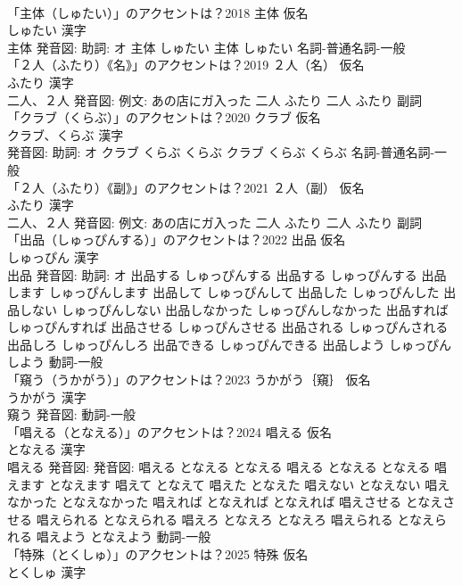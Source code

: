 \documentclass[8pt]{extreport}
\begin{document}
\begin{CJK}{UTF8}{min}
\\	「主体（しゅたい）」のアクセントは？2018	主体 仮名　
\\	しゅたい 漢字　
\\	主体 発音図: 助詞: オ	主体 しゅたい		主体 しゅたい				名詞-普通名詞-一般 
\\	「２人（ふたり）《名》」のアクセントは？2019	２人（名） 仮名　
\\	ふたり 漢字　
\\	二人、２人 発音図: 例文: あの店にガ入った	二人 ふたり		二人 ふたり				副詞 
\\	「クラブ（くらぶ）」のアクセントは？2020	クラブ 仮名　
\\	クラブ、くらぶ 漢字　
\\	発音図: 助詞: オ	クラブ くらぶ くらぶ		クラブ くらぶ くらぶ				名詞-普通名詞-一般 
\\	「２人（ふたり）《副》」のアクセントは？2021	２人（副） 仮名　
\\	ふたり 漢字　
\\	二人、２人 発音図: 例文: あの店にガ入った	二人 ふたり		二人 ふたり				副詞 
\\	「出品（しゅっぴんする）」のアクセントは？2022	出品 仮名　
\\	しゅっぴん 漢字　
\\	出品 発音図: 助詞: オ	出品する しゅっぴんする		出品する しゅっぴんする 出品します しゅっぴんします 出品して しゅっぴんして 出品した しゅっぴんした 出品しない しゅっぴんしない 出品しなかった しゅっぴんしなかった 出品すれば しゅっぴんすれば 出品させる しゅっぴんさせる 出品される しゅっぴんされる 出品しろ しゅっぴんしろ 出品できる しゅっぴんできる 出品しよう しゅっぴんしよう				動詞-一般 
\\	「窺う（うかがう）」のアクセントは？2023	うかがう｛窺｝ 仮名　
\\	うかがう 漢字　
\\	窺う 発音図:							動詞-一般 
\\	「唱える（となえる）」のアクセントは？2024	唱える 仮名　
\\	となえる 漢字　
\\	唱える 発音図: 発音図:	唱える となえる となえる		唱える となえる となえる 唱えます となえます 唱えて となえて 唱えた となえた 唱えない となえない 唱えなかった となえなかった 唱えれば となえれば となえれば 唱えさせる となえさせる 唱えられる となえられる 唱えろ となえろ となえろ 唱えられる となえられる 唱えよう となえよう				動詞-一般 
\\	「特殊（とくしゅ）」のアクセントは？2025	特殊 仮名　
\\	とくしゅ 漢字　

\end{CJK}
\end{document}
